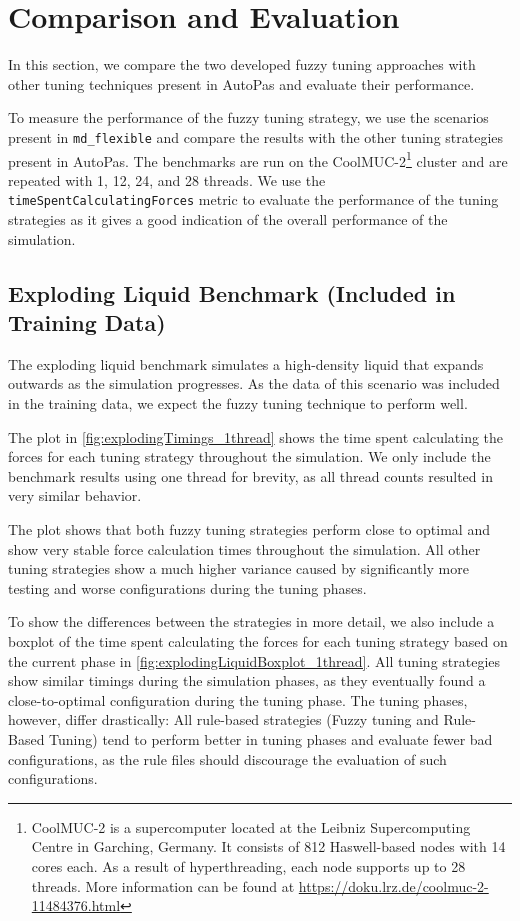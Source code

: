 \chapter{Comparison and Evaluation}
\label{sec:comparison_and_evaluation}

In this section, we compare the two developed fuzzy tuning approaches with other tuning techniques present in AutoPas and evaluate their performance.

\medskip

\noindent To measure the performance of the fuzzy tuning strategy, we use the scenarios present in \texttt{md\_flexible} and compare the results with the other tuning strategies present in AutoPas. The benchmarks are run on the CoolMUC-2\footnote{\label{CoolMucSpecs}CoolMUC-2 is a supercomputer located at the Leibniz Supercomputing Centre in Garching, Germany. It consists of 812 Haswell-based nodes with 14 cores each. As a result of hyperthreading, each node supports up to 28 threads. More information can be found at \url{https://doku.lrz.de/coolmuc-2-11484376.html}} cluster and are repeated with 1, 12, 24, and 28 threads. We use the \texttt{timeSpentCalculatingForces} metric to evaluate the performance of the tuning strategies as it gives a good indication of the overall performance of the simulation.


\section{Exploding Liquid Benchmark (Included in Training Data)}
\label{sec:explodingLiquidBenchmark}

The exploding liquid benchmark simulates a high-density liquid that expands outwards as the simulation progresses. As the data of this scenario was included in the training data, we expect the fuzzy tuning technique to perform well.

The plot in \autoref{fig:explodingTimings_1thread} shows the time spent calculating the forces for each tuning strategy throughout the simulation. We only include the benchmark results using one thread for brevity, as all thread counts resulted in very similar behavior.

The plot shows that both fuzzy tuning strategies perform close to optimal and show very stable force calculation times throughout the simulation. All other tuning strategies show a much higher variance caused by significantly more testing and worse configurations during the tuning phases.

To show the differences between the strategies in more detail, we also include a boxplot of the time spent calculating the forces for each tuning strategy based on the current phase in \autoref{fig:explodingLiquidBoxplot_1thread}. All tuning strategies show similar timings during the simulation phases, as they eventually found a close-to-optimal configuration during the tuning phase. The tuning phases, however, differ drastically: All rule-based strategies (Fuzzy tuning and Rule-Based Tuning) tend to perform better in tuning phases and evaluate fewer bad configurations, as the rule files should discourage the evaluation of such configurations.

